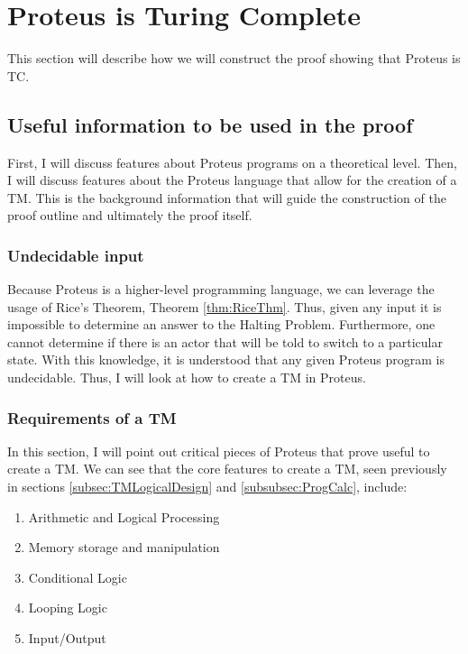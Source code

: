 \chapter{Proteus is Turing Complete}\label{chapter:ProteusTC}

This section will describe how we will construct the proof showing that Proteus is TC.

\section{Useful information to be used in the proof}

First, I will discuss features about Proteus programs on a theoretical level.
Then, I will discuss features about the Proteus language that allow for the creation of a TM.
This is the background information that will guide the construction of the proof outline and ultimately the proof itself.

\subsection{Undecidable input}\label{subsec:UndecidableInput}

Because Proteus is a higher-level programming language, we can leverage the usage of Rice's Theorem, Theorem \ref{thm:RiceThm}.
Thus, given any input it is impossible to determine an answer to the Halting Problem.
Furthermore, one cannot determine if there is an actor that will be told to switch to a particular state.
With this knowledge, it is understood that any given Proteus program is undecidable.
Thus, I will look at how to create a TM in Proteus.

\subsection{Requirements of a TM}\label{subsec:ReqsofTM}

In this section, I will point out critical pieces of Proteus that prove useful to create a TM.
We can see that the core features to create a TM, seen previously in sections \ref{subsec:TMLogicalDesign} and \ref{subsubsec:ProgCalc}, include:
\begin{enumerate}
    \item Arithmetic and Logical Processing
    \item Memory storage and manipulation
    \item Conditional Logic
    \item Looping Logic
    \item Input/Output
\end{enumerate}

